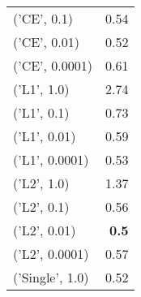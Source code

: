 \begin{tabular}{lr}
 ('CE', 0.1)     &           0.54 \\
 ('CE', 0.01)    &           0.52 \\
 ('CE', 0.0001)  &           0.61 \\
 ('L1', 1.0)     &           2.74 \\
 ('L1', 0.1)     &           0.73 \\
 ('L1', 0.01)    &           0.59 \\
 ('L1', 0.0001)  &           0.53 \\
 ('L2', 1.0)     &           1.37 \\
 ('L2', 0.1)     &           0.56 \\
 ('L2', 0.01)    &           {\bf 0.5}  \\
 ('L2', 0.0001)  &           0.57 \\
 ('Single', 1.0) &           0.52 \\
\hline
\end{tabular}